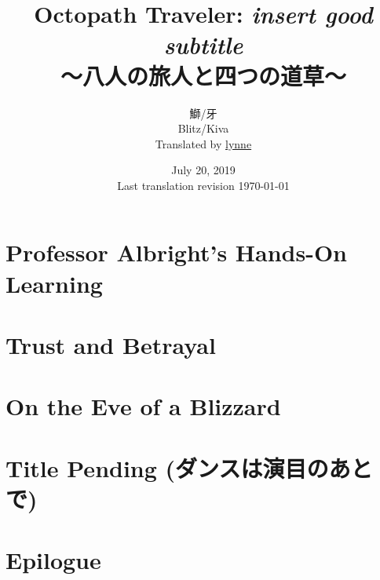 \documentclass[a4paper,11pt]{memoir}
\title{%
Octopath Traveler: \emph{insert good subtitle} \\
\large{～八人の旅人と四つの道草～}
}
\author{%
鰤/牙 \\
Blitz/Kiva \\
Translated by \href{https://twitter.com/plvpwaa}{lynne}
}
\date{%
July 20, 2019 \\
Last translation revision \today
}
\begin{document}
	\maketitle
	\pagebreak
	\tableofcontents*
	\pagebreak
	\chapter{Professor Albright's Hands-On Learning}
		
	\chapter{Trust and Betrayal}
	\chapter{On the Eve of a Blizzard}
	\chapter{Title Pending (ダンスは演目のあとで)}
	\chapter{Epilogue}
\end{document}

